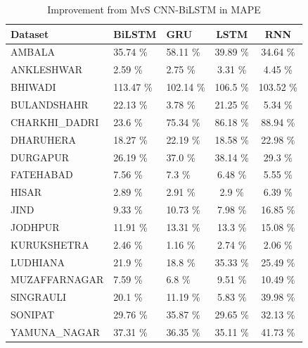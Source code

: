 \documentclass[a4paper,fleqn]{cas-dc}
\begin{document}
  \begin{table}[]
    \caption{Improvement from MvS CNN-BiLSTM in MAPE}
    \label{MAPE imp}
    \begin{tabular}{lllcc}
    \hline   Dataset       &   BiLSTM &   GRU &   LSTM &   RNN  \\ \hline
      AMBALA        &35.74           \% &58.11        \% &39.89         \% &34.64 \%       \\
      ANKLESHWAR      &2.59            \% &2.75         \% &3.31          \% &4.45 \%          \\
      BHIWADI        &113.47          \% &102.14       \% &106.5         \% &103.52 \%        \\
      BULANDSHAHR   &22.13           \% &3.78         \% &21.25         \% &5.34   \%        \\
      CHARKHI\_DADRI  &23.6            \% &75.34        \% &86.18         \% &88.94 \%         \\
      DHARUHERA      &18.27           \% &22.19        \% &18.58         \% &22.98 \%         \\
      DURGAPUR       &26.19           \% &37.0         \% &38.14         \% &29.3 \%          \\
      FATEHABAD       &7.56            \% &7.3          \% &6.48          \% &5.55 \%           \\
      HISAR           &2.89            \% &2.91         \% &2.9           \% &6.39 \%          \\
      JIND            &9.33            \% &10.73        \% &7.98          \% &16.85 \%         \\
      JODHPUR         &11.91           \% &13.31        \% &13.3          \% &15.08 \%          \\
      KURUKSHETRA     &2.46            \% &1.16         \% &2.74          \% &2.06 \%          \\
      LUDHIANA        &21.9            \% &18.8         \% &35.33         \% &25.49 \%         \\
      MUZAFFARNAGAR   &7.59            \% &6.8          \% &9.51          \% &10.49 \%          \\
      SINGRAULI      &20.1            \% &11.19        \% &5.83          \% &39.98 \%         \\
      SONIPAT        &29.76           \% &35.87        \% &29.65         \% &32.13 \%         \\
      YAMUNA\_NAGAR   &37.31           \% &36.35        \% &35.11         \% &41.73 \%         \\ \hline
    \end{tabular}
    \end{table}
\end{document}
